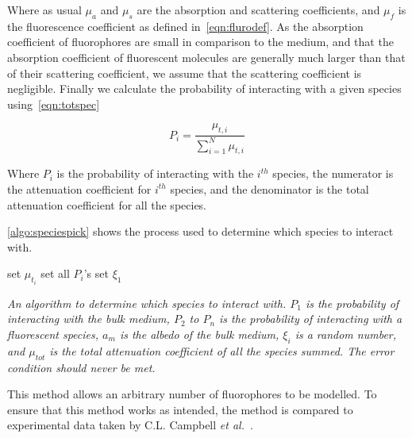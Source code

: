 Where as usual $\mu_a$ and $\mu_s$ are the absorption and scattering coefficients, and $\mu_f$ is the fluorescence coefficient as defined in~\cref{eqn:flurodef}.
As the absorption coefficient of fluorophores are small in comparison to the medium, and that the absorption coefficient of fluorescent molecules are generally much larger than that of their scattering coefficient, we assume that the scattering coefficient is negligible.
Finally we calculate the probability of interacting with a given species using~\cref{eqn:totspec}

\begin{equation}
P_i=\frac{\mu_{t,i}}{\sum\limits_{i=1}^{N} \mu_{t,i}}
\label{eqn:totspec}
\end{equation}

Where $P_i$ is the probability of interacting with the $i^{th}$ species, the numerator is the attenuation coefficient for $i^{th}$ species, and the denominator is the total attenuation coefficient for all the species.

\cref{algo:speciespick} shows the process used to determine which species to interact with.

\begin{center}
\begin{algorithm}[H]
\SetAlgoLined
  set $\mu_{t_{i}}$\;
  set all $P_i$'s\;
  set $\xi_1$\;
\
\caption{\textit{An algorithm to determine which species to interact with. $P_1$ is the probability of interacting with the bulk medium, $P_2$ to $P_n$ is the probability of interacting with a fluorescent species, $a_m$ is the albedo of the bulk medium, $\xi_i$ is a random number, and $\mu_{tot}$ is the total attenuation coefficient of all the species summed. The error condition should never be met.}}
\label{algo:speciespick}
\end{algorithm}
\end{center}

This method allows an arbitrary number of fluorophores to be modelled.
To ensure that this method works as intended, the method is compared to experimental data taken by C.L. Campbell \textit{et al.}~\cite{louisethesis}.

